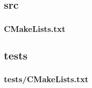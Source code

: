 \subsection{src}
\subsubsection{CMakeLists.txt} \label{subsec:rootCmake}

\newpage
\subsection{tests}
\subsubsection{tests/CMakeLists.txt}

